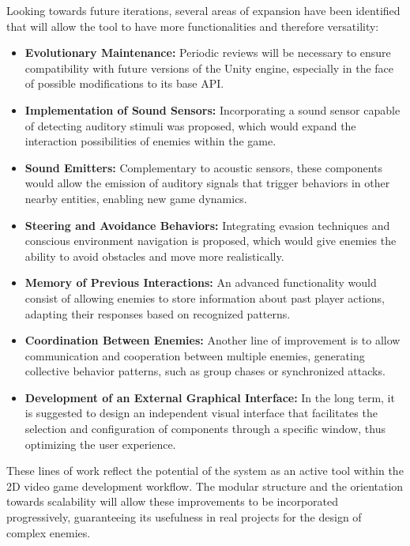 Looking towards future iterations, several areas of expansion have been identified that will allow the tool to have more functionalities and therefore versatility:\\
\begin{itemize}
  \item \textbf{Evolutionary Maintenance:} Periodic reviews will be necessary to ensure compatibility with future versions of the Unity engine, especially in the face of possible modifications to its base API.
  \item \textbf{Implementation of Sound Sensors:} Incorporating a sound sensor capable of detecting auditory stimuli was proposed, which would expand the interaction possibilities of enemies within the game.
  \item \textbf{Sound Emitters:} Complementary to acoustic sensors, these components would allow the emission of auditory signals that trigger behaviors in other nearby entities, enabling new game dynamics.
  \item \textbf{Steering and Avoidance Behaviors:} Integrating evasion techniques and conscious environment navigation is proposed, which would give enemies the ability to avoid obstacles and move more realistically.
  \item \textbf{Memory of Previous Interactions:} An advanced functionality would consist of allowing enemies to store information about past player actions, adapting their responses based on recognized patterns.
\item \textbf{Coordination Between Enemies:} Another line of improvement is to allow communication and cooperation between multiple enemies, generating collective behavior patterns, such as group chases or synchronized attacks.
 \item \textbf{Development of an External Graphical Interface:} In the long term, it is suggested to design an independent visual interface that facilitates the selection and configuration of components through a specific window, thus optimizing the user experience.
\end{itemize}

These lines of work reflect the potential of the system as an active tool within the 2D video game development workflow. The modular structure and the orientation towards scalability will allow these improvements to be incorporated progressively, guaranteeing its usefulness in real projects for the design of complex enemies.